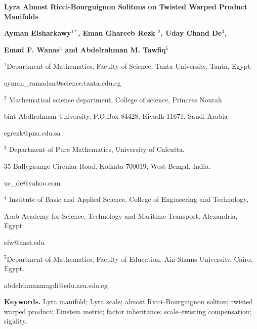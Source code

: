 \documentclass[a4paper,11pt]{article}
\theoremstyle{plain}
\numberwithin{equation}{section}
\begin{document}
\begin{center}
\Large \textbf{Lyra Almost Ricci-Bourguignon Solitons on Twisted Warped Product Manifolds}
 \end{center}
\centerline{\bf Ayman Elsharkawy${}^{1*}$, Eman Ghareeb Rezk ${}^{2}$, Uday Chand De$^3$,} \centerline{\bf Emad F. Wanas$^4$ and Abdelrahman M. Tawfiq$^5$}
\centerline{\small${}^{1}$Department of Mathematics, Faculty of Science, Tanta University, Tanta, Egypt.}
\centerline{\small ayman\_ramadan@science.tanta.edu.eg}
\centerline{\small $^{2}$ Mathematical science department, College of science, Princess Nourah  }
\centerline{\small bint Abdlrahman University, P.O.Box 84428, Riyadh 11671, Saudi Arabia}
\centerline{\small  egrezk@pnu.edu.sa}
\centerline{\small${}^{3}$ Department of Pure Mathematics, University of Calcutta,} \centerline{\small 35 Ballygaunge Circular Road, Kolkata 700019, West Bengal, India.}
\centerline{\small uc\_de@yahoo.com}
\centerline{\small $^4$ Institute of Basic and Applied Science, College of Engineering and Technology,}\centerline{ Arab Academy for Science, Technology and Maritime Transport, Alexandria, Egypt}\centerline{ efw@aast.edu}
\centerline{\small${}^{5}$Department of Mathematics, Faculty of Education, Ain-Shams University, Cairo, Egypt.}
\centerline{abdelrhmanmagdi@edu.asu.edu.eg}



\begin{abstract}
	This paper defines Lyra almost Ricci--Bourguignon solitons on twisted warped product manifolds and investigates the interaction between the twisting function, the Lyra scale, and the soliton potential field. We derive the horizontal, vertical, and mixed components of the soliton equation and obtain trace, gradient, and factor-inheritance characterizations. The mixed equation yields new rigidity phenomena: a base-dependent Lyra scale preserves the ordinary separability obstruction, whereas a fiber-dependent scale admits a weighted compensation law that allows genuinely nonseparable twisting functions. We also establish Einstein reductions for conformal, Killing, homothetic, concurrent, and gradient potential fields. Exact flat and nonflat examples, together with local and compact nonexistence results, demonstrate the geometric significance of the scale--twisting interaction.
\end{abstract}



\textbf{Keywords.} Lyra manifold; Lyra scale; almost Ricci--Bourguignon soliton;
twisted warped product; Einstein metric; factor inheritance;
scale--twisting compensation; rigidity.
\end{document}

